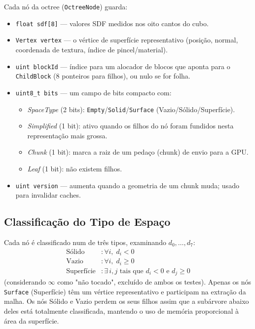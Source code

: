 \documentclass[10pt,a4paper]{article}
\begin{document}
Cada nó da octree (\lstinline{OctreeNode}) guarda:
\begin{itemize}[leftmargin=2em]
  \item \lstinline{float sdf[8]} — valores SDF medidos nos oito cantos do cubo.
  \item \lstinline{Vertex vertex} — o vértice de superfície representativo
    (posição, normal, coordenada de textura, índice de pincel/material).
  \item \lstinline{uint blockId} — índice para um alocador de blocos que
    aponta para o \lstinline{ChildBlock} (8 ponteiros para filhos), ou nulo
    se for folha.
  \item \lstinline{uint8_t bits} — um campo de bits compacto com:
    \begin{itemize}
      \item \emph{SpaceType} (2 bits): \lstinline{Empty}/\lstinline{Solid}/\lstinline{Surface}
        (Vazio/Sólido/Superfície).
      \item \emph{Simplified} (1 bit): ativo quando os filhos do nó foram
        fundidos nesta representação mais grossa.
      \item \emph{Chunk} (1 bit): marca a raiz de um pedaço (chunk) de
        envio para a GPU.
      \item \emph{Leaf} (1 bit): não existem filhos.
    \end{itemize}
  \item \lstinline{uint version} — aumenta quando a geometria de um chunk
    muda; usado para invalidar caches.
\end{itemize}

\subsection{Classificação do Tipo de Espaço}
\label{sec:octree:spacetype}

Cada nó é classificado num de três tipos, examinando
$d_0,\ldots,d_7$:
\begin{align*}
  \text{Sólido}   &: \forall i,\; d_i < 0\phantom{\text{ e }\exists j} \\
  \text{Vazio}    &: \forall i,\; d_i \geq 0\\
  \text{Superfície} &: \exists\, i,j \text{ tais que } d_i < 0
    \text{ e } d_j \geq 0
\end{align*}
(considerando $\infty$ como "não tocado", excluído de ambos os testes).
Apenas os nós \lstinline{Surface} (Superfície) têm um vértice
representativo e participam na extração da malha. Os nós Sólido e
Vazio perdem os seus filhos assim que a subárvore abaixo deles está
totalmente classificada, mantendo o uso de memória proporcional à
área da superfície.
\end{document}
